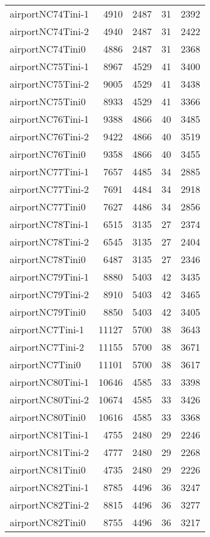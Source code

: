 \documentclass[../../../thesis.tex]{subfiles}
\begin{document}
\begin{longtable}{lrrrr}
airportNC74Tini-1 & 4910 & 2487 & 31 & 2392 \\
airportNC74Tini-2 & 4940 & 2487 & 31 & 2422 \\
airportNC74Tini0 & 4886 & 2487 & 31 & 2368 \\
airportNC75Tini-1 & 8967 & 4529 & 41 & 3400 \\
airportNC75Tini-2 & 9005 & 4529 & 41 & 3438 \\
airportNC75Tini0 & 8933 & 4529 & 41 & 3366 \\
airportNC76Tini-1 & 9388 & 4866 & 40 & 3485 \\
airportNC76Tini-2 & 9422 & 4866 & 40 & 3519 \\
airportNC76Tini0 & 9358 & 4866 & 40 & 3455 \\
airportNC77Tini-1 & 7657 & 4485 & 34 & 2885 \\
airportNC77Tini-2 & 7691 & 4484 & 34 & 2918 \\
airportNC77Tini0 & 7627 & 4486 & 34 & 2856 \\
airportNC78Tini-1 & 6515 & 3135 & 27 & 2374 \\
airportNC78Tini-2 & 6545 & 3135 & 27 & 2404 \\
airportNC78Tini0 & 6487 & 3135 & 27 & 2346 \\
airportNC79Tini-1 & 8880 & 5403 & 42 & 3435 \\
airportNC79Tini-2 & 8910 & 5403 & 42 & 3465 \\
airportNC79Tini0 & 8850 & 5403 & 42 & 3405 \\
airportNC7Tini-1 & 11127 & 5700 & 38 & 3643 \\
airportNC7Tini-2 & 11155 & 5700 & 38 & 3671 \\
airportNC7Tini0 & 11101 & 5700 & 38 & 3617 \\
airportNC80Tini-1 & 10646 & 4585 & 33 & 3398 \\
airportNC80Tini-2 & 10674 & 4585 & 33 & 3426 \\
airportNC80Tini0 & 10616 & 4585 & 33 & 3368 \\
airportNC81Tini-1 & 4755 & 2480 & 29 & 2246 \\
airportNC81Tini-2 & 4777 & 2480 & 29 & 2268 \\
airportNC81Tini0 & 4735 & 2480 & 29 & 2226 \\
airportNC82Tini-1 & 8785 & 4496 & 36 & 3247 \\
airportNC82Tini-2 & 8815 & 4496 & 36 & 3277 \\
airportNC82Tini0 & 8755 & 4496 & 36 & 3217 \\

\end{longtable}
\end{document}

